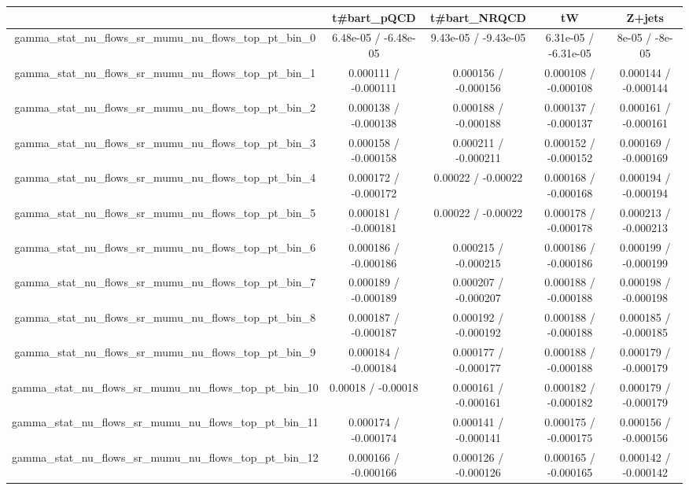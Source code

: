\documentclass[10pt]{article}
\begin{document}
\begin{table}[htbp]
\begin{center}
\begin{tabular}{|c|c|c|c|c|}
\hline 
      & t#bar{t}_{pQCD}      & t#bar{t}_{NRQCD}      & tW      & Z+jets \\ 
\hline 
  gamma_stat_nu_flows_sr_mumu_nu_flows_top_pt_bin_0 & 6.48e-05 / -6.48e-05 & 9.43e-05 / -9.43e-05 & 6.31e-05 / -6.31e-05 & 8e-05 / -8e-05 \\ 
  gamma_stat_nu_flows_sr_mumu_nu_flows_top_pt_bin_1 & 0.000111 / -0.000111 & 0.000156 / -0.000156 & 0.000108 / -0.000108 & 0.000144 / -0.000144 \\ 
  gamma_stat_nu_flows_sr_mumu_nu_flows_top_pt_bin_2 & 0.000138 / -0.000138 & 0.000188 / -0.000188 & 0.000137 / -0.000137 & 0.000161 / -0.000161 \\ 
  gamma_stat_nu_flows_sr_mumu_nu_flows_top_pt_bin_3 & 0.000158 / -0.000158 & 0.000211 / -0.000211 & 0.000152 / -0.000152 & 0.000169 / -0.000169 \\ 
  gamma_stat_nu_flows_sr_mumu_nu_flows_top_pt_bin_4 & 0.000172 / -0.000172 & 0.00022 / -0.00022 & 0.000168 / -0.000168 & 0.000194 / -0.000194 \\ 
  gamma_stat_nu_flows_sr_mumu_nu_flows_top_pt_bin_5 & 0.000181 / -0.000181 & 0.00022 / -0.00022 & 0.000178 / -0.000178 & 0.000213 / -0.000213 \\ 
  gamma_stat_nu_flows_sr_mumu_nu_flows_top_pt_bin_6 & 0.000186 / -0.000186 & 0.000215 / -0.000215 & 0.000186 / -0.000186 & 0.000199 / -0.000199 \\ 
  gamma_stat_nu_flows_sr_mumu_nu_flows_top_pt_bin_7 & 0.000189 / -0.000189 & 0.000207 / -0.000207 & 0.000188 / -0.000188 & 0.000198 / -0.000198 \\ 
  gamma_stat_nu_flows_sr_mumu_nu_flows_top_pt_bin_8 & 0.000187 / -0.000187 & 0.000192 / -0.000192 & 0.000188 / -0.000188 & 0.000185 / -0.000185 \\ 
  gamma_stat_nu_flows_sr_mumu_nu_flows_top_pt_bin_9 & 0.000184 / -0.000184 & 0.000177 / -0.000177 & 0.000188 / -0.000188 & 0.000179 / -0.000179 \\ 
  gamma_stat_nu_flows_sr_mumu_nu_flows_top_pt_bin_10 & 0.00018 / -0.00018 & 0.000161 / -0.000161 & 0.000182 / -0.000182 & 0.000179 / -0.000179 \\ 
  gamma_stat_nu_flows_sr_mumu_nu_flows_top_pt_bin_11 & 0.000174 / -0.000174 & 0.000141 / -0.000141 & 0.000175 / -0.000175 & 0.000156 / -0.000156 \\ 
  gamma_stat_nu_flows_sr_mumu_nu_flows_top_pt_bin_12 & 0.000166 / -0.000166 & 0.000126 / -0.000126 & 0.000165 / -0.000165 & 0.000142 / -0.000142 \\ 

\end{tabular}
\end{center}
\end{table}
\end{document}
